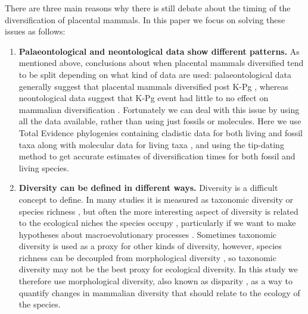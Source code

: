 \documentclass[12pt,letterpaper]{article}
\begin{document}
There are three main reasons why there is still debate about the timing of the diversification of placental mammals. In this paper we focus on solving these issues as follows: %
  \begin{enumerate}
    \item \textbf{Palaeontological and neontological data show different patterns.}
    As mentioned above, conclusions about when placental mammals diversified tend to be split depending on what kind of data are used: palaeontological data generally suggest that placental mammals diversified post K-Pg \citep[e.g.][]{O'Leary08022013}, whereas neontological data suggest that K-Pg event had little to no effect on mammalian diversification \citep{bininda2007delayed,meredithimpacts2011,Stadler12042011}. 
    Fortunately we can deal with this issue by using all the data available, rather than using just fossils or molecules. 
    Here we use Total Evidence phylogenies containing cladistic data for both living and fossil taxa along with molecular data for living taxa \citep{eernissetaxonomic1993,ronquista2012}, and using the tip-dating method \citep{ronquista2012,Wood01032013} to get accurate estimates of diversification times for both fossil and living species.
    \item \textbf{Diversity can be defined in different ways.}
    Diversity is a difficult concept to define. 
    In many studies it is measured as taxonomic diversity or species richness \citep{Stadler12042011,meredithimpacts2011,O'Leary08022013}, but often the more interesting aspect of diversity is related to the ecological niches the species occupy \citep{Wesley-Hunt2005,Brusatte12092008,toljagictriassic-jurassic2013}, particularly if we want to  make hypotheses about macroevolutionary processes \citep{Pearman2008149,OlsonRadiation,Losos2010,glor2010phylogenetic}.
    Sometimes taxonomic diversity is used as a proxy for other kinds of diversity, however, species richness can be decoupled from morphological diversity \citep{slaterCetacean,ruta2013,hopkinsdecoupling2013}, so taxonomic diversity may not be the best proxy for ecological diversity.
    In this study we therefore use morphological diversity, also known as disparity \citep{Wills1994,BIJ:BIJ455,Wesley-Hunt2005,brusatte50,cisneros2010,prentice2011,anderson2012using,Hughes20082013,bentonmodels2014},
    as a way to quantify changes in mammalian diversity that should relate to the ecology of the species.

\end{enumerate}
\end{document}
